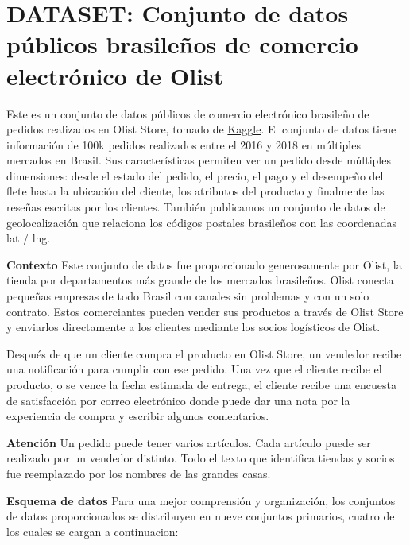 \documentclass[11pt]{article}
\begin{document}
    \hypertarget{dataset-conjunto-de-datos-puxfablicos-brasileuxf1os-de-comercio-electruxf3nico-de-olist}{%
\section{DATASET: Conjunto de datos públicos brasileños de comercio
electrónico de
Olist}\label{dataset-conjunto-de-datos-puxfablicos-brasileuxf1os-de-comercio-electruxf3nico-de-olist}}

Este es un conjunto de datos públicos de comercio electrónico brasileño
de pedidos realizados en Olist Store, tomado de
\href{https://www.kaggle.com/olistbr/brazilian-ecommerce?select=olist_geolocation_dataset.csv}{Kaggle}.
El conjunto de datos tiene información de 100k pedidos realizados entre
el 2016 y 2018 en múltiples mercados en Brasil. Sus características
permiten ver un pedido desde múltiples dimensiones: desde el estado del
pedido, el precio, el pago y el desempeño del flete hasta la ubicación
del cliente, los atributos del producto y finalmente las reseñas
escritas por los clientes. También publicamos un conjunto de datos de
geolocalización que relaciona los códigos postales brasileños con las
coordenadas lat / lng.

\textbf{Contexto} Este conjunto de datos fue proporcionado generosamente
por Olist, la tienda por departamentos más grande de los mercados
brasileños. Olist conecta pequeñas empresas de todo Brasil con canales
sin problemas y con un solo contrato. Estos comerciantes pueden vender
sus productos a través de Olist Store y enviarlos directamente a los
clientes mediante los socios logísticos de Olist.

Después de que un cliente compra el producto en Olist Store, un vendedor
recibe una notificación para cumplir con ese pedido. Una vez que el
cliente recibe el producto, o se vence la fecha estimada de entrega, el
cliente recibe una encuesta de satisfacción por correo electrónico donde
puede dar una nota por la experiencia de compra y escribir algunos
comentarios.

\textbf{Atención} Un pedido puede tener varios artículos. Cada artículo
puede ser realizado por un vendedor distinto. Todo el texto que
identifica tiendas y socios fue reemplazado por los nombres de las
grandes casas.

\textbf{Esquema de datos} Para una mejor comprensión y organización, los
conjuntos de datos proporcionados se distribuyen en nueve conjuntos
primarios, cuatro de los cuales se cargan a continuacion:
\end{document}
